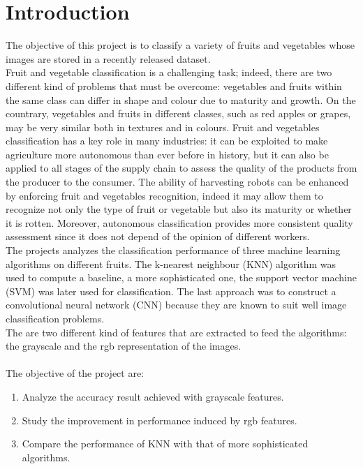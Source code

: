 \documentclass{article}
\begin{document}
\section{Introduction}
The objective of this project is to classify a variety of fruits and vegetables whose images are stored in a recently released dataset.\\
Fruit and vegetable classification is a challenging task; indeed, there are two different kind of problems that must be overcome: vegetables and fruits within the same class can differ in shape and colour due to maturity and growth. On the countrary, vegetables and fruits in different classes, such as red apples or grapes, may be very similar both in textures and in colours. 
Fruit and vegetables classification has a key role in many industries: it can be exploited to make agriculture more autonomous than ever before in history, but it can also be applied to all stages of the supply chain to assess the quality of the products from the producer to the consumer. 
The ability of harvesting robots can be enhanced by enforcing fruit and vegetables recognition, indeed it may allow them to recognize not only the type of fruit or vegetable but also its maturity or whether it is rotten. Moreover, autonomous classification provides more consistent quality assessment since it does not depend of the opinion of different workers. \cite{review}
\\
The projects analyzes the classification performance of three machine learning algorithms on different fruits. The k-nearest neighbour (KNN) algorithm was used to compute a baseline, a more sophisticated one, the support vector machine (SVM) was later used for classification. The last approach was to construct a convolutional neural network (CNN) because they are known to suit well image classification problems. \\
The are two different kind of features that are extracted to feed the algorithms: the grayscale and the rgb representation of the images.\\\\
The objective of the project are:
\begin{enumerate}
\item Analyze the accuracy result achieved with grayscale features.
\item Study the improvement in performance induced by rgb features.
\item Compare the performance of KNN with that of more sophisticated algorithms.
\end{enumerate}
\end{document}
